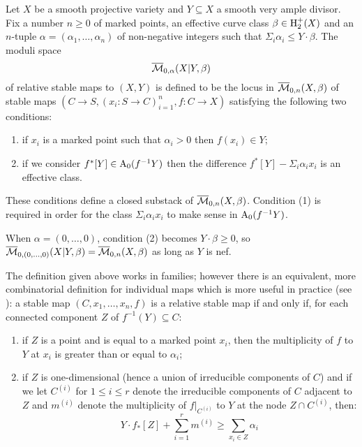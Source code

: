 \begin{definition} {\cite[Definition 1.1]{Ga}}  Let $X$ be a smooth projective variety and $Y \subseteq X$ a smooth very ample divisor. Fix a number $n \geq 0$ of marked points, an effective curve class $\beta \in \operatorname{H}_2^+(X)$ and an $n$-tuple $\alpha = (\alpha_1, \ldots, \alpha_n)$ of non-negative integers such that $\Sigma_i \alpha_i \leq Y \cdot \beta$. The moduli space
\begin{equation*} \overline{\mathcal M}_{0,\alpha}(X|Y,\beta) \end{equation*}
of relative stable maps to $(X,Y)$ is defined to be the locus in $\overline{\mathcal M}_{0,n}(X,\beta)$ of stable maps $(C \to S , (x_i : S \to C)_{i=1}^n , f : C \to X)$ satisfying the following two conditions:
\begin{enumerate}
\item if $x_i$ is a marked point such that $\alpha_i > 0$ then $f(x_i) \in Y$;
\item if we consider $f^* [Y] \in \operatorname{A}_0(f^{-1}Y)$ then the difference $f^* [Y] - \Sigma_i \alpha_i x_i$ is an effective class.
\end{enumerate}
These conditions define a closed substack of $\overline{\mathcal M}_{0,n}(X,\beta)$. Condition (1) is required in order for the class $\Sigma_i \alpha_i x_i$ to make sense in $\operatorname{A}_0(f^{-1}Y)$.
\end{definition}

\begin{remark} When $\alpha = (0, \ldots, 0)$, condition (2) becomes $Y \cdot \beta \geq 0$, so $\overline{\mathcal M}_{0,(0,\ldots,0)}(X|Y,\beta) = \overline{\mathcal M}_{0,n}(X,\beta)$ as long as $Y$ is nef.\end{remark}

\begin{remark} The definition given above works in families; however there is an equivalent, more combinatorial definition for individual maps which is more useful in practice (see \cite[Remark 1.4]{Ga}): a stable map $(C,x_1, \ldots, x_n,f)$ is a relative stable map if and only if, for each connected component $Z$ of $f^{-1}(Y) \subseteq C$:
\begin{enumerate}
\item if $Z$ is a point and is equal to a marked point $x_i$, then the multiplicity of $f$ to $Y$ at $x_i$ is greater than or equal to $\alpha_i$;
\item if $Z$ is one-dimensional (hence a union of irreducible components of $C$) and if we let $C^{(i)}$ for $1 \leq i \leq r$ denote the irreducible components of $C$ adjacent to $Z$ and $m^{(i)}$ denote the multiplicity of $f|_{C^{(i)}}$ to $Y$ at the node $Z \cap C^{(i)}$, then:
\begin{equation} \label{Relative stable map internal component inequality} Y \cdot f_* [Z] + \sum_{i=1}^r m^{(i)} \geq \sum_{x_i \in Z} \alpha_i \end{equation}
\end{enumerate} \end{remark}

